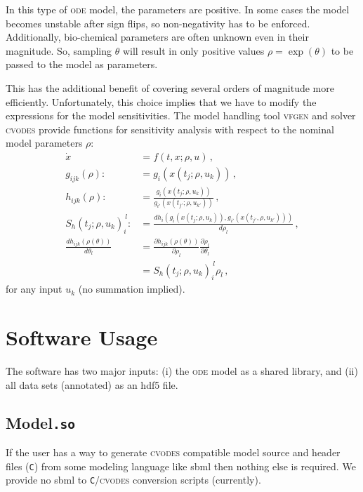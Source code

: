 \documentclass[utf8,english,DIV=12,12pt]{scrartcl}
\newcommand{\ode}{\textsc{ode}}
\newcommand{\sens}[5][j]{\ensuremath{S_{#2}(t_{#1};\rho,u_{#5})_{#3}^{~#4}}}
\newcommand{\software}[1]{\textsc{#1}}
\newcommand{\standard}[1]{\textsf{#1}}
\begin{document}
In this type of \ode{} model, the parameters are positive. In some
cases the model becomes unstable after sign flips, so non-negativity
has to be enforced. Additionally, bio-chemical parameters are often
unknown even in their magnitude. So, sampling $\theta$ will result in
only positive values $\rho=\exp(\theta)$ to be passed to the model as
parameters.

This has the additional benefit of covering several orders of
magnitude more efficiently. Unfortunately, this choice implies that we
have to modify the expressions for the model sensitivities. The model
handling tool \software{vfgen} and solver \software{cvodes} provide
functions for sensitivity analysis with respect to the nominal model
parameters $\rho$:
\begin{equation}
  \label{eq:hsens_theta}
  \begin{split}
    \dot x&=f(t,x;\rho,u)\,,\\
    g_{ijk}(\rho):&=g_i(x(t_j;\rho,u_k))\,,\\
    h_{ijk}(\rho):&=\frac{g_i(x(t_j;\rho,u_k))}{g_{i'}(x(t_{j'};\rho,u_{k'}))}\,,\\
    \sens{h}{i}{l}{k}:&=\frac{d h_i(g_i(x(t_j;\rho,u_k)),g_{i'}(x(t_{j'},\rho,u_{k'})))}{d\rho_l}\,,\\
    \frac{dh_{ijk}(\rho(\theta))}{d\theta_l}&=\frac{\partial h_{ijk}(\rho(\theta))}{\partial\rho_l}\frac{\partial \rho_l}{\partial\theta_l}\\
    &=\sens{h}{i}{l}{k}\rho_l\,,
  \end{split}  
\end{equation}
for any input $u_k$ (no summation implied).

\section{Software Usage}
\label{sec:software}

The software has two major inputs: (i) the \ode{} model as a shared
library, and (ii) all data sets (annotated) as an \standard{hdf5} file.

\subsection{Model\hfill\texttt{.so}}
\label{sec:soModel}

If the user has a way to generate \software{cvodes} compatible model
source and header files (\texttt{C}) from some modeling language like
\standard{sbml} then nothing else is required. We provide no
\standard{sbml} to \texttt{C}/\software{cvodes} conversion scripts (currently).
\end{document}

